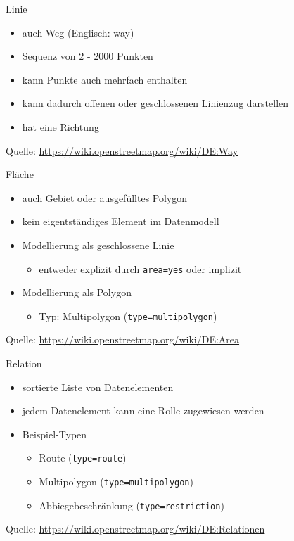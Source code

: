 \documentclass{beamer}
\begin{document}
\begin{frame}[fragile]{Linie}
\begin{itemize}
  \item auch Weg (Englisch: way)
  \item Sequenz von 2 - 2000 Punkten
  \item kann Punkte auch mehrfach enthalten
  \item kann dadurch offenen oder geschlossenen Linienzug darstellen
  \item hat eine Richtung
\end{itemize}

Quelle: \url{https://wiki.openstreetmap.org/wiki/DE:Way}

\end{frame}
\begin{frame}[fragile]{Fläche}

\begin{itemize}
  \item auch Gebiet oder ausgefülltes Polygon
  \item kein eigentständiges Element im Datenmodell
  \item Modellierung als geschlossene Linie
  \begin{itemize}
    \item entweder explizit durch \texttt{area=yes} oder implizit
  \end{itemize}
  \item Modellierung als Polygon
  \begin{itemize}
    \item Typ: Multipolygon (\texttt{type=multipolygon})
  \end{itemize}
\end{itemize}
Quelle: \url{https://wiki.openstreetmap.org/wiki/DE:Area}
\end{frame}
\begin{frame}{Relation}
\begin{itemize}
  \item sortierte Liste von Datenelementen
  \item jedem Datenelement kann eine Rolle zugewiesen werden
  \item Beispiel-Typen
  \begin{itemize}
    \item Route (\texttt{type=route})
    \item Multipolygon (\texttt{type=multipolygon})
    \item Abbiegebeschränkung (\texttt{type=restriction})
   \end{itemize}
\end{itemize}
Quelle: \url{https://wiki.openstreetmap.org/wiki/DE:Relationen}
\end{frame}
\end{document}
